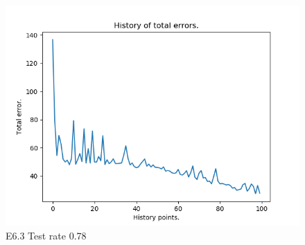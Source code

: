 \documentclass{classrep}
\begin{document}
\begin{figure}[H]
\begin{minipage}{0.5\linewidth}
				\centering
				\includegraphics[scale=0.25]{seeds_nn_m9.png}
				\caption{E6.3 Test rate  0.78}
				\label{E6.3}
			\end{minipage}
		\end{figure}
		\FloatBarrier
\end{document}
